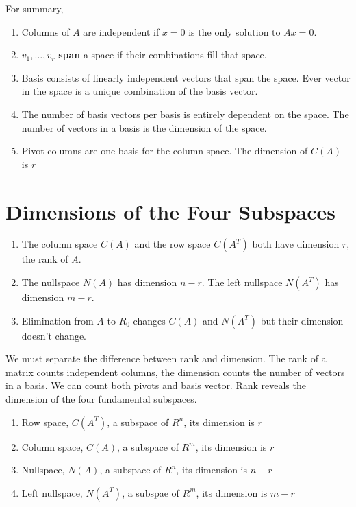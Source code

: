 For summary,
\begin{enumerate}
    \item Columns of \(A\) are independent if \(x = 0\) is the only solution to \(Ax = 0\).
    \item \(v_1, \ldots, v_r\) \textbf{span} a space if their combinations fill that space.  
    \item Basis consists of linearly independent vectors that span the space. Ever vector in the space is a unique combination of the basis vector. 
    \item The number of basis vectors per basis is entirely dependent on the space. The number of vectors in a basis is the dimension of the space. 
    \item Pivot columns are one basis for the column space. The dimension of \(C(A)\) is \(r\)     
\end{enumerate}

\section{Dimensions of the Four Subspaces}

\begin{enumerate}
    \item The column space \(C(A)\) and the row space \(C(A^T)\) both have dimension \(r\), the rank of \(A\). 
    \item The nullspace \(N(A)\) has dimension \(n - r\). The left nullspace \(N(A^T)\) has dimension \(m - r\). 
    \item Elimination from \(A\) to \(R_0\) changes \(C(A)\) and \(N(A^T)\) but their dimension doesn't change.
\end{enumerate}

We must separate the difference between rank and dimension. The rank of a matrix counts independent columns, the dimension counts the number of vectors in a basis. We can count both pivots and basis vector. Rank reveals the dimension of the four fundamental subspaces. 

\begin{enumerate}
    \item Row space, \(C(A^T)\), a subspace of \(R^n\), its dimension is \(r\)
    \item Column space, \(C(A)\), a subspace of \(R^m\), its dimension is \(r\)     
    \item Nullspace, \(N(A)\), a subspace of \(R^n\), its dimension is \(n - r\)
    \item Left nullspace, \(N(A^T)\), a subspae of \(R^m\), its dimension is \(m - r\)      
\end{enumerate}

